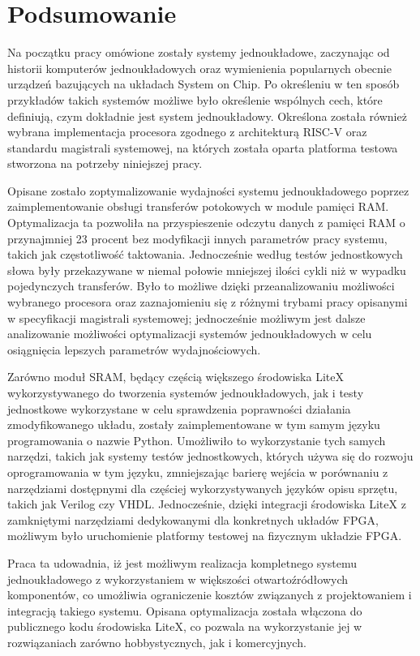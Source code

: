 \section{Podsumowanie}

Na początku pracy omówione zostały systemy jednoukładowe, zaczynając od historii komputerów jednoukładowych oraz wymienienia popularnych obecnie urządzeń bazujących na układach System on Chip. Po określeniu w ten sposób przykładów takich systemów możliwe było określenie wspólnych cech, które definiują, czym dokładnie jest system jednoukładowy. Określona została również wybrana implementacja procesora zgodnego z architekturą RISC-V oraz standardu magistrali systemowej, na których została oparta platforma testowa stworzona na potrzeby niniejszej pracy.

Opisane zostało zoptymalizowanie wydajności systemu jednoukładowego poprzez zaimplementowanie obsługi transferów potokowych w module pamięci RAM. Optymalizacja ta pozwoliła na przyspieszenie odczytu danych z pamięci RAM o przynajmniej 23 procent bez modyfikacji innych parametrów pracy systemu, takich jak częstotliwość taktowania. Jednocześnie według testów jednostkowych słowa były przekazywane w niemal połowie mniejszej ilości cykli niż w wypadku pojedynczych transferów. Było to możliwe dzięki przeanalizowaniu możliwości wybranego procesora oraz zaznajomieniu się z różnymi trybami pracy opisanymi w specyfikacji magistrali systemowej; jednocześnie możliwym jest dalsze analizowanie możliwości optymalizacji systemów jednoukładowych w celu osiągnięcia lepszych parametrów wydajnościowych.

Zarówno moduł SRAM, będący częścią większego środowiska LiteX wykorzystywanego do tworzenia systemów jednoukładowych, jak i testy jednostkowe wykorzystane w celu sprawdzenia poprawności działania zmodyfikowanego układu, zostały zaimplementowane w tym samym języku programowania o nazwie Python. Umożliwiło to wykorzystanie tych samych narzędzi, takich jak systemy testów jednostkowych, których używa się do rozwoju oprogramowania w tym języku, zmniejszając barierę wejścia w porównaniu z narzędziami dostępnymi dla częściej wykorzystywanych języków opisu sprzętu, takich jak Verilog czy VHDL. Jednocześnie, dzięki integracji środowiska LiteX z zamkniętymi narzędziami dedykowanymi dla konkretnych układów FPGA, możliwym było uruchomienie platformy testowej na fizycznym układzie FPGA.

Praca ta udowadnia, iż jest możliwym realizacja kompletnego systemu jednoukładowego z wykorzystaniem w większości otwartoźródłowych komponentów, co umożliwia ograniczenie kosztów związanych z projektowaniem i integracją takiego systemu. Opisana optymalizacja została włączona do publicznego kodu środowiska LiteX, co pozwala na wykorzystanie jej w rozwiązaniach zarówno hobbystycznych, jak i komercyjnych.
